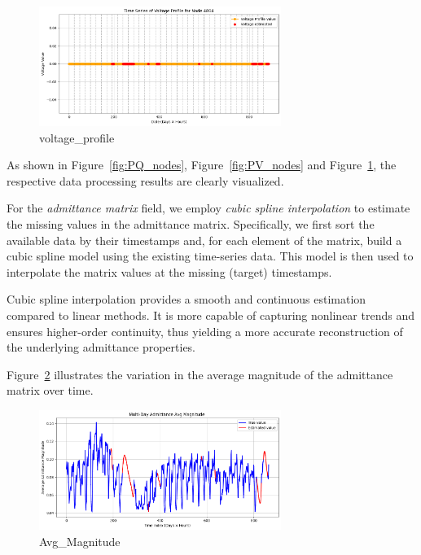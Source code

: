 \documentclass[12pt]{article}
\begin{document}
\begin{figure}[H]
    \centering
    \includegraphics[width=0.7\textwidth]{picture/voltage_profile.png}
    \caption{voltage\_profile}
    \label{fig:voltage_profile}
\end{figure}

As shown in Figure~\ref{fig:PQ_nodes}, Figure~\ref{fig:PV_nodes} and Figure~\ref{fig:voltage_profile}, the respective data processing results are clearly visualized.

For the \emph{admittance matrix} field, we employ \emph{cubic spline interpolation} to estimate the missing values in the admittance matrix. Specifically, we first sort the available data by their timestamps and, for each element of the matrix, build a cubic spline model using the existing time-series data. This model is then used to interpolate the matrix values at the missing (target) timestamps.

Cubic spline interpolation provides a smooth and continuous estimation compared to linear methods. It is more capable of capturing nonlinear trends and ensures higher-order continuity, thus yielding a more accurate reconstruction of the underlying admittance properties.

Figure~\ref{fig:Avg_Magnitude} illustrates the variation in the average magnitude of the admittance matrix over time. 

\begin{figure}[H]
    \centering
    \includegraphics[width=0.7\textwidth]{picture/Avg_Magnitude.png}
    \caption{Avg\_Magnitude}
    \label{fig:Avg_Magnitude}
\end{figure}
\end{document}
